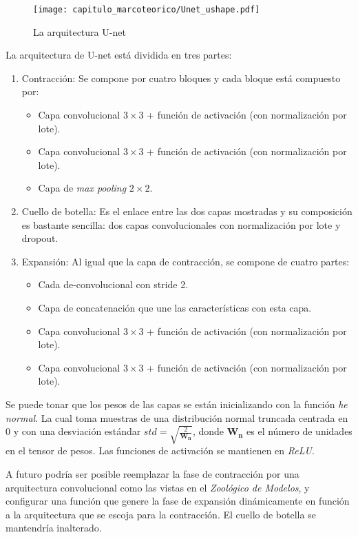 \begin{figure}[H]
    \centering
    \texttt{[image: capitulo\_marcoteorico/Unet\_ushape.pdf]}
    \caption{La arquitectura U-net}\label{fig:unet}
\end{figure}

La arquitectura de U-net está dividida en tres partes:

\begin{enumerate}
    \item{Contracción:} Se compone por cuatro bloques y cada bloque está compuesto por:
        \begin{itemize}
            \item Capa convolucional \(3 \times3 \) + función de activación (con normalización por lote).
            \item Capa convolucional \(3 \times3 \) + función de activación (con normalización por lote).
            \item Capa de \emph{max pooling} \(2 \times2 \).
        \end{itemize}
    \item{Cuello de botella:} Es el enlace entre las dos capas mostradas y su composición es bastante 
    sencilla: dos capas convolucionales con normalización por lote y dropout.
    \item{Expansión:} Al igual que la capa de contracción, se compone de cuatro partes:
    \begin{itemize}
        \item Cada de-convolucional con stride 2.
        \item Capa de concatenación que une las características con esta capa.
        \item  Capa convolucional \(3 \times3 \) + función de activación (con normalización por lote).
        \item  Capa convolucional \(3 \times3 \) + función de activación (con normalización por lote).
    \end{itemize}
\end{enumerate}

Se puede tonar que los pesos de las capas se están inicializando con la función
\emph{he normal}. La cual toma muestras de una distribución normal truncada
centrada en 0 y con una desviación estándar \(std =
\sqrt{\frac{2}{\mathbf{W_{n}}}}\), donde \(\mathbf{W_{n}}\) es el número de
unidades en el tensor de pesos.  Las funciones de activación se mantienen en
\emph{ReLU}.~\cite{He2015} 

A futuro podría ser posible reemplazar la fase de contracción por una arquitectura
convolucional como las vistas en el \emph{Zoológico de Modelos}, y configurar una función
que genere la fase de expansión dinámicamente en función a la arquitectura que se escoja 
para la contracción. El cuello de botella se mantendría inalterado.

